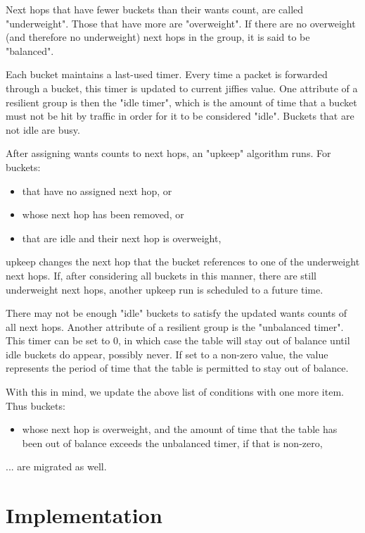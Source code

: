 \documentclass[letterpaper]{article}
\begin{document}
Next hops that have fewer buckets than their wants count, are called
"underweight". Those that have more are "overweight". If there are no
overweight (and therefore no underweight) next hops in the group, it is
said to be "balanced".

Each bucket maintains a last-used timer. Every time a packet is forwarded
through a bucket, this timer is updated to current jiffies value. One
attribute of a resilient group is then the "idle timer", which is the
amount of time that a bucket must not be hit by traffic in order for it to
be considered "idle". Buckets that are not idle are busy.

After assigning wants counts to next hops, an "upkeep" algorithm runs. For
buckets:

\begin{itemize}
\item that have no assigned next hop, or
\item whose next hop has been removed, or
\item that are idle and their next hop is overweight,
\end{itemize}

upkeep changes the next hop that the bucket references to one of the
underweight next hops. If, after considering all buckets in this manner,
there are still underweight next hops, another upkeep run is scheduled to a
future time.

There may not be enough "idle" buckets to satisfy the updated wants counts
of all next hops. Another attribute of a resilient group is the "unbalanced
timer". This timer can be set to 0, in which case the table will stay out
of balance until idle buckets do appear, possibly never. If set to a
non-zero value, the value represents the period of time that the table is
permitted to stay out of balance.

With this in mind, we update the above list of conditions with one more
item. Thus buckets:

\begin{itemize}
\item whose next hop is overweight, and the amount of time that the table
  has been out of balance exceeds the unbalanced timer, if that is
  non-zero,
\end{itemize}

... are migrated as well.

\section{Implementation}
\end{document}
